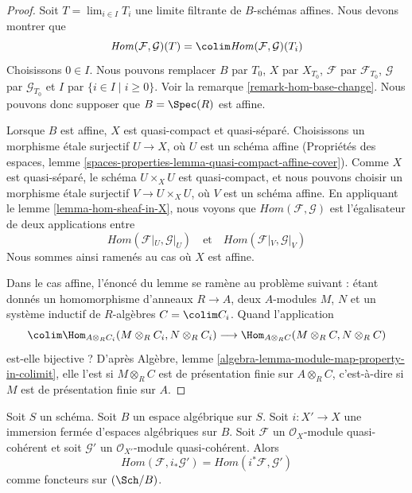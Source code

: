 \begin{proof}
Soit $T = \lim_{i \in I} T_i$ une limite filtrante de $B$-schémas affines.
Nous devons montrer que
$$
\mathit{Hom}(\mathcal{F}, \mathcal{G})(T) =
\colim \mathit{Hom}(\mathcal{F}, \mathcal{G})(T_i)
$$
Choisissons $0 \in I$. Nous pouvons remplacer $B$ par $T_0$, $X$ par
$X_{T_0}$, $\mathcal{F}$ par $\mathcal{F}_{T_0}$, $\mathcal{G}$ par
$\mathcal{G}_{T_0}$ et $I$ par $\{i \in I \mid i \geq 0\}$. Voir la
remarque \ref{remark-hom-base-change}. Nous pouvons donc supposer que
$B = \Spec(R)$ est affine.

\medskip\noindent
Lorsque $B$ est affine, $X$ est quasi-compact et quasi-séparé. Choisissons un
morphisme \'etale surjectif $U \to X$, où $U$ est un schéma affine (Propriétés
des espaces, lemme
\ref{spaces-properties-lemma-quasi-compact-affine-cover}). Comme $X$ est
quasi-séparé, le schéma $U \times_X U$ est quasi-compact, et nous pouvons
choisir un morphisme \'etale surjectif $V \to U \times_X U$, où $V$ est un
schéma affine. En appliquant le lemme \ref{lemma-hom-sheaf-in-X}, nous voyons
que $\mathit{Hom}(\mathcal{F}, \mathcal{G})$ est l'égalisateur de deux
applications entre
$$
\mathit{Hom}(\mathcal{F}|_U, \mathcal{G}|_U)
\quad\text{et}\quad
\mathit{Hom}(\mathcal{F}|_V, \mathcal{G}|_V)
$$
Nous sommes ainsi ramenés au cas où $X$ est affine.

\medskip\noindent
Dans le cas affine, l'énoncé du lemme se ramène au problème suivant : étant
donnés un homomorphisme d'anneaux $R \to A$, deux $A$-modules $M$, $N$ et un
système inductif de $R$-algèbres $C = \colim C_i$. Quand l'application
$$
\colim \Hom_{A \otimes_R C_i}(M \otimes_R C_i, N \otimes_R C_i)
\longrightarrow
\Hom_{A \otimes_R C}(M \otimes_R C, N \otimes_R C)
$$
est-elle bijective ? D'après Algèbre, lemme
\ref{algebra-lemma-module-map-property-in-colimit}, elle l'est si
$M \otimes_R C$ est de présentation finie sur $A \otimes_R C$, c'est-à-dire
si $M$ est de présentation finie sur $A$.
\end{proof}

\begin{lemma}
\label{lemma-hom-closed}
Soit $S$ un schéma. Soit $B$ un espace algébrique sur $S$. Soit
$i : X' \to X$ une immersion fermée d'espaces algébriques sur $B$. Soit
$\mathcal{F}$ un $\mathcal{O}_X$-module quasi-cohérent et soit
$\mathcal{G}'$ un $\mathcal{O}_{X'}$-module quasi-cohérent. Alors
$$
\mathit{Hom}(\mathcal{F}, i_*\mathcal{G}') =
\mathit{Hom}(i^*\mathcal{F}, \mathcal{G}')
$$
comme foncteurs sur $(\Sch/B)$.
\end{lemma}

